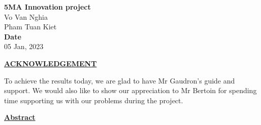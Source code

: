 \onehalfspacing


\vspace*{\fill}
\begin{center}
  \Large{\textbf{5MA Innovation project}}\\
  \vspace*{1\baselineskip}
  Vo Van Nghia\\
  Pham Tuan Kiet\\
  \vfill
  \vspace*{\fill}
  \Large{\textbf{Date}}\\
  05 Jan, 2023
\end{center}

\newpage

\newpage
{}
\renewcommand{\contentsname}{Table of contents}
\tableofcontents

\newpage

\begin{center}
  \underline{\textbf{ACKNOWLEDGEMENT}}
\end{center}
To achieve the results today, we are glad to have Mr Gaudron’s guide and support. We would also like to show our appreciation to Mr Bertoin for spending time supporting us with our problems during the project.

\newpage

\begin{center}
  \underline{\textbf{Abstract}}
\end{center}

\newpage


